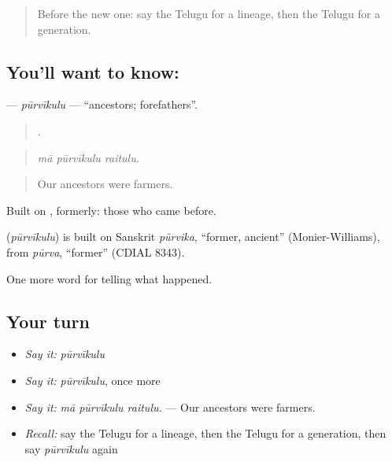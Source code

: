 \label{lesson:TE-C357-purvikulu}



\begin{quote}
Before the new one: say the Telugu for a lineage, then the Telugu for a generation.
\end{quote}

\subsection*{You'll want to know: }
\textbf{} — \emph{pūrvīkulu} — \textquotedblleft{}ancestors; forefathers\textquotedblright{}.

\begin{quote}
  .
\end{quote}

\begin{quote}
\emph{mā pūrvīkulu raitulu.}
\end{quote}

\begin{quote}
Our ancestors were farmers.
\end{quote}

Built on , formerly: those who came before.

\begin{cousinweb}
\textbf{} (\emph{pūrvīkulu}) is built on Sanskrit \emph{pūrvika}, \textquotedblleft{}former, ancient\textquotedblright{} (Monier-Williams), from \emph{pūrva}, \textquotedblleft{}former\textquotedblright{} (CDIAL 8343).
\end{cousinweb}

\begin{grammarlens}[title={What you've built}]
One more word for telling what happened.
\end{grammarlens}

\subsection*{Your turn}
\begin{itemize}
\raggedright
  \item \emph{Say it:} \emph{pūrvīkulu}
  \item \emph{Say it:} \emph{pūrvīkulu}, once more
  \item \emph{Say it:} \emph{mā pūrvīkulu raitulu.} — Our ancestors were farmers.
  \item \emph{Recall:} say the Telugu for a lineage, then the Telugu for a generation, then say \emph{pūrvīkulu} again
\end{itemize}

